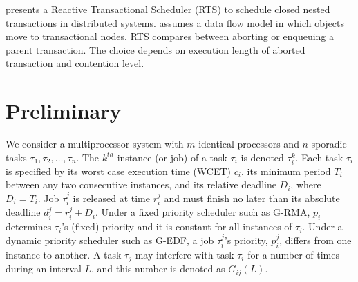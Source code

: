 \documentclass[10pt, conference, compsocconf]{IEEEtran}
\begin{document}
\cite{6267834} presents a Reactive Transactional Scheduler (RTS) to schedule closed nested transactions in distributed systems. \cite{6267834} assumes a data flow model in which objects move to transactional nodes. RTS compares between aborting or enqueuing a parent transaction. The choice depends on execution length of aborted transaction and contention level. 
%
\begin{comment}
Our work builds upon~\cite{stmconcurrencycontrol:emsoft11,lcmdac2012,pnf_dac_asp}. FBLT allows multiple objects per transaction with no a-priori knowledge needed about those objects. We upper bound transactional retries and task response times under FBLT, and identify the conditions under which FBLT has  better schedulability than other synchronization techniques.
\end{comment}
%
\section{Preliminary}

We consider a multiprocessor system with $m$ identical processors and $n$ sporadic tasks $\tau_1, \tau_2,\ldots, \tau_n$. The $k^{th}$ instance (or job) of a task $\tau_i$ is denoted $\tau_i^k$. Each task $\tau_i$ is specified by its worst case execution time (WCET) $c_i$, its minimum period $T_i$ between any two consecutive instances, and its relative deadline $D_i$, where $D_i=T_i$. Job $\tau_i^j$ is released at time $r_i^j$ and must finish no later than its absolute deadline $d_i^j=r_i^j+D_i$. Under a fixed priority scheduler such as G-RMA, $p_i$ determines $\tau_i$'s (fixed) priority and it is constant for all instances of $\tau_i$. Under a dynamic priority scheduler such as G-EDF, a job $\tau_i^j$'s priority, $p_i^j$, differs from one instance to another. 
A task $\tau_j$ may interfere with task $\tau_i$ for a number of times during an interval $L$, and this number is denoted as $G_{ij}(L)$. 
\end{document}
